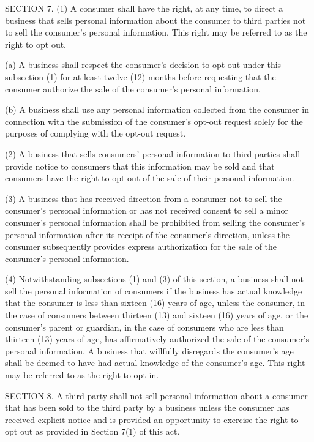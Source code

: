      SECTION 7.  (1)  A consumer shall have the right, at any time, to direct a business that sells personal information about the consumer to third parties not to sell the consumer's personal information.  This right may be referred to as the right to opt out.

          (a)  A business shall respect the consumer's decision to opt out under this subsection (1) for at least twelve (12) months before requesting that the consumer authorize the sale of the consumer's personal information.

          (b)  A business shall use any personal information collected from the consumer in connection with the submission of the consumer's opt-out request solely for the purposes of complying with the opt-out request.

     (2)  A business that sells consumers' personal information to third parties shall provide notice to consumers that this information may be sold and that consumers have the right to opt out of the sale of their personal information.

     (3)  A business that has received direction from a consumer not to sell the consumer's personal information or has not received consent to sell a minor consumer's personal information shall be prohibited from selling the consumer's personal information after its receipt of the consumer's direction, unless the consumer subsequently provides express authorization for the sale of the consumer's personal information.

     (4)  Notwithstanding subsections (1) and (3) of this section, a business shall not sell the personal information of consumers if the business has actual knowledge that the consumer is less than sixteen (16) years of age, unless the consumer, in the case of consumers between thirteen (13) and sixteen (16) years of age, or the consumer's parent or guardian, in the case of consumers who are less than thirteen (13) years of age, has affirmatively authorized the sale of the consumer's personal information.  A business that willfully disregards the consumer's age shall be deemed to have had actual knowledge of the consumer's age.  This right may be referred to as the right to opt in.

     SECTION 8.  A third party shall not sell personal information about a consumer that has been sold to the third party by a business unless the consumer has received explicit notice and is provided an opportunity to exercise the right to opt out as provided in Section 7(1) of this act.

